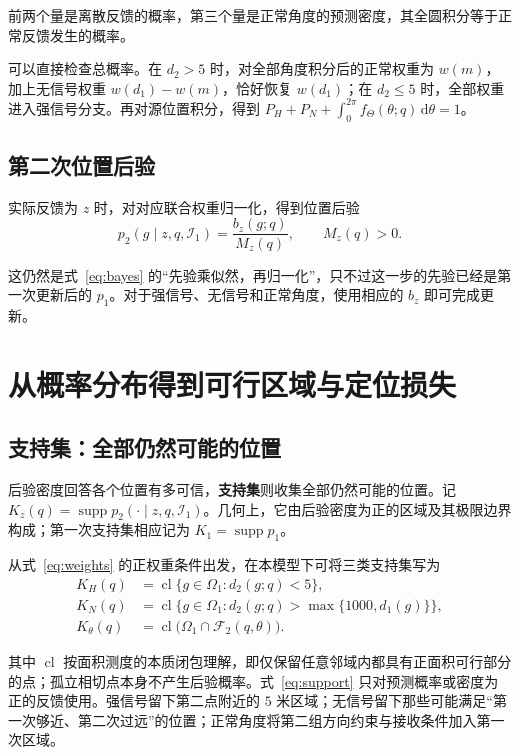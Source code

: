 \documentclass[UTF8,a4paper,zihao=-4,fontset=none]{ctexart}
\numberwithin{equation}{section}
\newcommand{\dd}{\,\mathrm d}
\newcommand{\supp}{\operatorname{supp}}
\newcommand{\cl}{\operatorname{cl}}
\begin{document}
前两个量是离散反馈的概率，第三个量是正常角度的预测密度，其全圆积分等于正常反馈发生的概率。

可以直接检查总概率。在 \(d_2>5\) 时，对全部角度积分后的正常权重为 \(w(m)\)，加上无信号权重 \(w(d_1)-w(m)\)，恰好恢复 \(w(d_1)\)；在 \(d_2\le5\) 时，全部权重进入强信号分支。再对源位置积分，得到 \(P_H+P_N+\int_0^{2\pi}f_\Theta(\theta;q)\dd\theta=1\)。

\subsection{第二次位置后验}
实际反馈为 \(z\) 时，对对应联合权重归一化，得到位置后验
\begin{equation}\label{eq:posterior2}
p_2(g\mid z,q,\mathcal I_1)=\frac{b_z(g;q)}{M_z(q)},\qquad M_z(q)>0.
\end{equation}

这仍然是式~\eqref{eq:bayes} 的“先验乘似然，再归一化”，只不过这一步的先验已经是第一次更新后的 \(p_1\)。对于强信号、无信号和正常角度，使用相应的 \(b_z\) 即可完成更新。

\section{从概率分布得到可行区域与定位损失}
\subsection{支持集：全部仍然可能的位置}
后验密度回答各个位置有多可信，\textbf{支持集}则收集全部仍然可能的位置。记 \(K_z(q)=\supp p_2(\cdot\mid z,q,\mathcal I_1)\)。几何上，它由后验密度为正的区域及其极限边界构成；第一次支持集相应记为 \(K_1=\supp p_1\)。

从式~\eqref{eq:weights} 的正权重条件出发，在本模型下可将三类支持集写为
\begin{equation}\label{eq:support}
\begin{aligned}
K_H(q)&=\cl\{g\in\Omega_1:d_2(g;q)<5\},\\
K_N(q)&=\cl\{g\in\Omega_1:d_2(g;q)>\max\{1000,d_1(g)\}\},\\
K_\theta(q)&=\cl\bigl(\Omega_1\cap\mathcal F_2(q,\theta)\bigr).
\end{aligned}
\end{equation}

其中 \(\cl\) 按面积测度的本质闭包理解，即仅保留任意邻域内都具有正面积可行部分的点；孤立相切点本身不产生后验概率。式~\eqref{eq:support} 只对预测概率或密度为正的反馈使用。强信号留下第二点附近的 \(5\) 米区域；无信号留下那些可能满足“第一次够近、第二次过远”的位置；正常角度将第二组方向约束与接收条件加入第一次区域。
\end{document}
